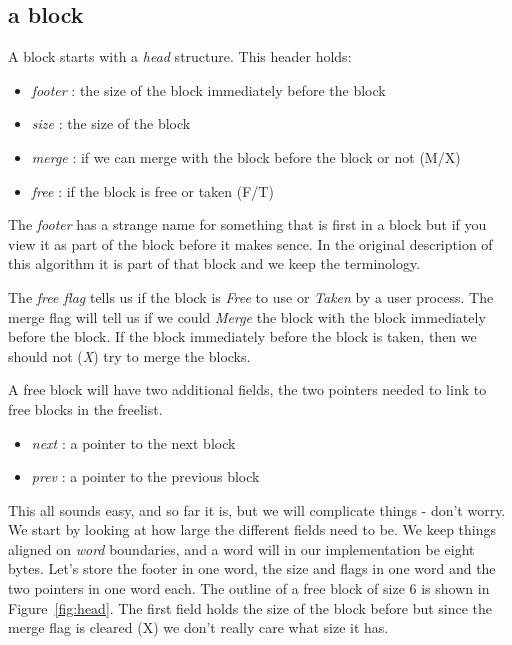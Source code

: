 \documentclass[a4paper,11pt]{article}
\begin{document}
\subsection{a block}

A block starts with a {\em head} structure. This header holds:

\begin{itemize}
\item {\em footer} : the size of the block immediately before the block
\item {\em size} : the size of the block
\item {\em merge} : if we can merge with the block before the block or not (M/X)
\item {\em free} : if the block is free or taken (F/T)
\end{itemize}

The {\em footer} has a strange name for something that is first in a
block but if you view it as part of the block before it makes
sence. In the original description of this algorithm it is part of
that block and we keep the terminology.

The {\em free flag} tells us if the block is {\em Free} to use or {\em
  Taken} by a user process. The merge flag will tell us if we could
{\em Merge} the block with the block immediately before the block. If
the block immediately before the block is taken, then we should not
({\em X}) try to merge the blocks.

A free block will have two additional fields, the two pointers
needed to link to free blocks in the freelist.

\begin{itemize}
\item {\em next} : a pointer to the next block
\item {\em prev} : a pointer to the previous block
\end{itemize}
  
This all sounds easy, and so far it is, but we will complicate things -
don't worry. We start by looking at how large the different fields
need to be. We keep things aligned on {\em word} boundaries, and a word
will in our implementation be eight bytes. Let's store the footer in
one word, the size and flags in one word and the two pointers in one
word each. The outline of a free block of size 6 is shown in Figure~\ref{fig:head}. The first field holds the size of the block before but
since the merge flag is cleared (X) we don't really care what size it
has.
\end{document}

